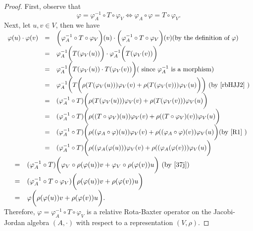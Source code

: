 \documentclass[12pt]{amsart}
\begin{document}
\begin{proof}  First, observe that
\begin{equation}
	\varphi=\varphi_A^{-1}\circ T\circ\varphi_V\iff \varphi_A\circ \varphi=T\circ \varphi_V .
	\label{R1}
\end{equation}		
	Next, let $ u,v\in V$, then we  have\\
	$ \begin{array}{lll}
\varphi(u)\cdot\varphi(v)&=&\bigg(\varphi_A^{-1}\circ T\circ\varphi_V\bigg)(u)\cdot \bigg(\varphi_A^{-1}\circ T\circ\varphi_V\bigg)(v)  \mbox{(by the definition of $ \varphi$)} \\
&=&\varphi_A^{-1}\bigg(T(\varphi_{V}(u))\bigg)\cdot\varphi_A^{-1}\bigg(T(\varphi_{V}(v))\bigg)\\
&=&\varphi_A^{-1}\bigg(T(\varphi_{V}(u))\cdot T(\varphi_{V}(v))\bigg)(\text{ since $ \varphi_A^{-1} $ is a morphism})\\
&=&\varphi_A^{-1}\bigg(T\bigg(\rho(T(\varphi_{V}(u)))\varphi_{V}(v)+\rho(T(\varphi_{V}(v)))\varphi_{V}(u)\bigg)\bigg)\mbox{ (by $ \ref{rbHJJ2}$ )}\\
&=&(\varphi_A^{-1}\circ T)\bigg(\rho(T(\varphi_{V}(u)))\varphi_{V}(v)+\rho(T(\varphi_{V}(v)))\varphi_{V}(u)\bigg)\\
&=&(\varphi_A^{-1}\circ T)\bigg(\rho((T\circ\varphi_{V})(u))\varphi_{V}(v)+\rho((T\circ\varphi_{V})(v))\varphi_{V}(u)\bigg)\\
&=&(\varphi_A^{-1}\circ T)\bigg(\rho((\varphi_A\circ\varphi)(u))\varphi_{V}(v)+\rho((\varphi_A\circ\varphi)(v))\varphi_{V}(u)\bigg) \mbox{(by \ref{R1} )}\\
&=&(\varphi_A^{-1}\circ T)\bigg(\rho((\varphi_A(\varphi(u)))\varphi_{V}(v)+\rho((\varphi_A(\varphi(v)))\varphi_{V}(u)\bigg) \\
	\end{array} $\\
$ \begin{array}{lll}
&=&(\varphi_A^{-1}\circ T)\bigg(\varphi_{V}\circ\rho(\varphi(u))v+\varphi_{V}\circ\rho(\varphi(v))u\bigg)\mbox{ (by \ref{37j})} \\
&=&(\varphi_A^{-1}\circ T\circ \varphi_{V})\bigg(\rho(\varphi(u))v+\rho(\varphi(v))u\bigg)\\
&=&\varphi\bigg(\rho(\varphi(u))v+\rho(\varphi(v))u\bigg).
	\end{array} $ \\
	Therefore, $	\varphi=\varphi_A^{-1}\circ T\circ\varphi_V$ 
	is a relative Rota-Baxter operator on the Jacobi-Jordan algebra $(A,\cdot)$ with
	respect to a representation $(V,\rho)$.	
\end{proof}
\end{document}
